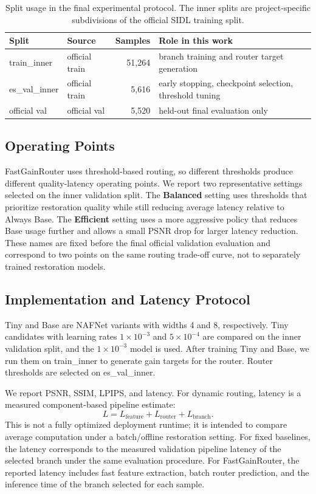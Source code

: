 \documentclass[11pt]{article}
\begin{document}
\begin{table}[t]
\centering
\caption{Split usage in the final experimental protocol. The inner splits are project-specific subdivisions of the official SIDL training split.}
\label{tab:split}
\small
\begin{tabular}{llrl}
\toprule
Split & Source & Samples & Role in this work \\
\midrule
train\_inner & official train & 51,264 & branch training and router target generation \\
es\_val\_inner & official train & 5,616 & early stopping, checkpoint selection, threshold tuning \\
official val & official val & 5,520 & held-out final evaluation only \\
\bottomrule
\end{tabular}
\end{table}

\subsection{Operating Points}

FastGainRouter uses threshold-based routing, so different thresholds produce different quality-latency operating points.
We report two representative settings selected on the inner validation split.
The \textbf{Balanced} setting uses thresholds that prioritize restoration quality while still reducing average latency relative to Always Base.
The \textbf{Efficient} setting uses a more aggressive policy that reduces Base usage further and allows a small PSNR drop for larger latency reduction.
These names are fixed before the final official validation evaluation and correspond to two points on the same routing trade-off curve, not to separately trained restoration models.

\subsection{Implementation and Latency Protocol}

Tiny and Base are NAFNet variants with widths 4 and 8, respectively.
Tiny candidates with learning rates $1\times10^{-3}$ and $5\times10^{-4}$ are compared on the inner validation split, and the $1\times10^{-3}$ model is used.
After training Tiny and Base, we run them on train\_inner to generate gain targets for the router.
Router thresholds are selected on es\_val\_inner.

We report PSNR, SSIM, LPIPS, and latency.
For dynamic routing, latency is a measured component-based pipeline estimate:
\[
L=L_{\text{feature}}+L_{\text{router}}+L_{\text{branch}}.
\]
This is not a fully optimized deployment runtime; it is intended to compare average computation under a batch/offline restoration setting.
For fixed baselines, the latency corresponds to the measured validation pipeline latency of the selected branch under the same evaluation procedure.
For FastGainRouter, the reported latency includes fast feature extraction, batch router prediction, and the inference time of the branch selected for each sample.
\end{document}

